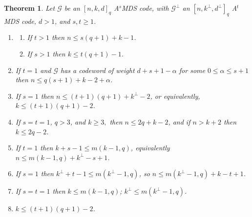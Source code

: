 \documentclass[11pt,a4paper]{amsart}
\newcommand{\AS}{ A$^s$MDS }
\newcommand{\G}{\mathcal{G}}
\theoremstyle{plain}
\newtheorem{theorem}{Theorem}[section]
\theoremstyle{definition}
\theoremstyle{remark}
\begin{document}
	\begin{theorem}\label{thm: ub ASMDS}
		Let $\G$ be an  $[n,k,d]_q$ \AS code, with  $\G^\perp$ an $[n,k^\perp,d^\perp]_q$ A$^t$MDS code, $d>1$, and $s, t\ge 1$.
		\begin{enumerate}
			\item  \begin{enumerate}
				\item If $t>1$ then $n\le s(q+1)+k-1$. \label{part: thm: ub ASMDS 1a }
				\item If $s>1$ then $k\le t(q+1)-1$. \label{part: thm: ub ASMDS 1b }
			\end{enumerate} \label{part: 1 thm ub ASMDS}
			\item If $t=1$ and $\G$ has a codeword of weight $d+s+1-\alpha$ for some $0\le \alpha\le s+1$ then $n\le q(s+1)+k-2+\alpha$. \label{part: 2 thm ub ASMDS}
			\item If $s=1$ then $n\le (t+1)(q+1)+k^\perp -2$, or equivalently, $k\le (t+1)(q+1)-2$. \label{part: 3 thm ub ASMDS}
			\item If $s=t=1$, $q>3$, and $k\ge 3,$  then $n\le 2q+k-2$, and if $n>k+2$ then $k\le 2q-2$. \label{part: 4 thm ub ASMDS}
			\item If $t=1$ then $k+s-1\le m(k-1,q)$, equivalently $n\le m(k-1,q) +k^\perp -s+1$.\label{part: 5 thm ub ASMDS}
			\item If $s=1$ then $k^\perp+t-1\le m(k^\perp-1,q)$, so $n\le m(k^\perp-1,q)+k-t+1$. \label{part: 6 thm ub ASMDS}
			\item If $s=t=1$ then $k\le m(k-1,q)$; $k^\perp \le m(k^\perp-1,q)$. \label{part: 7 thm ub ASMDS}
			\item $k\le (t+1)(q+1)-2$. \label{part: 8 thm ub ASMDS}
		\end{enumerate}
	\end{theorem}
\end{document}
